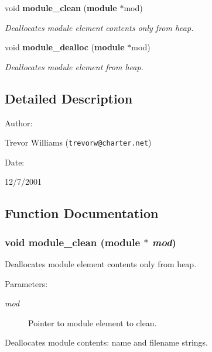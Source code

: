 \begin{CompactItemize}
void {\bf module\_\-clean} ({\bf module} $\ast$mod)
\begin{CompactList}\small\item\em Deallocates module element contents only from heap.\item\end{CompactList}\item 
void {\bf module\_\-dealloc} ({\bf module} $\ast$mod)
\begin{CompactList}\small\item\em Deallocates module element from heap.\item\end{CompactList}\end{CompactItemize}


\subsection{Detailed Description}


\begin{Desc}
\item[Author: ]\par
Trevor Williams ({\tt trevorw@charter.net}) \end{Desc}
\begin{Desc}
\item[Date: ]\par
12/7/2001\end{Desc}


\subsection{Function Documentation}
\subsubsection{\setlength{\rightskip}{0pt plus 5cm}void module\_\-clean ({\bf module} $\ast$ {\em mod})}\label{module_8c_a7}


Deallocates module element contents only from heap.

\begin{Desc}
\item[Parameters: ]\par
\begin{description}
\item[{\em 
mod}]Pointer to module element to clean.\end{description}
\end{Desc}
Deallocates module contents: name and filename strings. 
